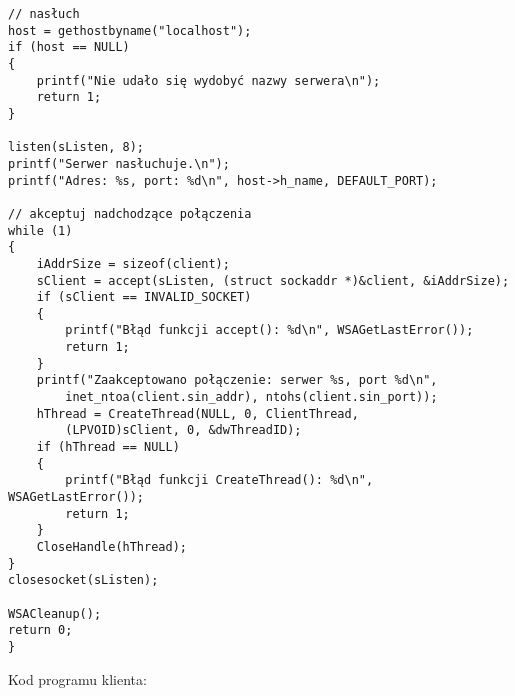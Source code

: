 \begin{scriptsize}
\begin{verbatim}
// nasłuch
host = gethostbyname("localhost");
if (host == NULL)
{
    printf("Nie udało się wydobyć nazwy serwera\n");
    return 1;
}

listen(sListen, 8);
printf("Serwer nasłuchuje.\n");
printf("Adres: %s, port: %d\n", host->h_name, DEFAULT_PORT);

// akceptuj nadchodzące połączenia
while (1)
{
    iAddrSize = sizeof(client);
    sClient = accept(sListen, (struct sockaddr *)&client, &iAddrSize);
    if (sClient == INVALID_SOCKET)
    {
        printf("Błąd funkcji accept(): %d\n", WSAGetLastError());
        return 1;
    }
    printf("Zaakceptowano połączenie: serwer %s, port %d\n", 
        inet_ntoa(client.sin_addr), ntohs(client.sin_port));
    hThread = CreateThread(NULL, 0, ClientThread,
        (LPVOID)sClient, 0, &dwThreadID);
    if (hThread == NULL)
    {
        printf("Błąd funkcji CreateThread(): %d\n", WSAGetLastError());
        return 1;
    } 
    CloseHandle(hThread); 
} 
closesocket(sListen);

WSACleanup();
return 0;
}
\end{verbatim}
\end{scriptsize}

Kod programu klienta: 

